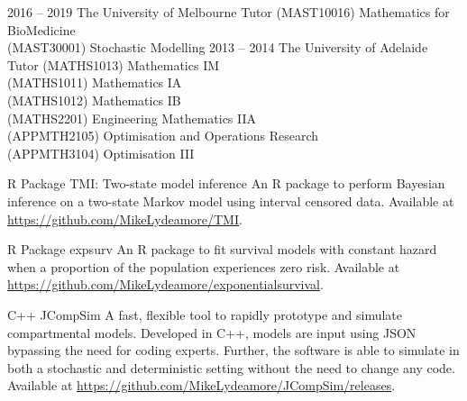 \documentclass[9pt]{developercv} %
\begin{document}
\begin{entrylist}
    \entry
        {2016 -- 2019}
        {The University of Melbourne}
        {Tutor}
        {(MAST10016) Mathematics for BioMedicine \\
        (MAST30001) Stochastic Modelling}
    \entry
        {2013 -- 2014}
        {The University of Adelaide}
        {Tutor}
        {(MATHS1013) Mathematics IM \\
        (MATHS1011) Mathematics IA \\
        (MATHS1012) Mathematics IB \\
        (MATHS2201) Engineering Mathematics IIA \\
        (APPMTH2105) Optimisation and Operations Research \\
        (APPMTH3104) Optimisation III}
\end{entrylist}


\begin{entrylist}
    \entry
        {R Package}
        {TMI: Two-state model inference}
        {}
        {An R package to perform Bayesian inference on a two-state Markov model using interval censored data. Available at \url{https://github.com/MikeLydeamore/TMI}.}
        
\entry
        {R Package}
        {expsurv}
        {}
        {An R package to fit survival models with constant hazard when a proportion of the population experiences zero risk. Available at \url{https://github.com/MikeLydeamore/exponentialsurvival}.}
        
\entry
        {C++}
        {JCompSim}
        {}
        {A fast, flexible tool to rapidly prototype and simulate compartmental models. Developed in C++, models are input using JSON bypassing the need for coding experts. Further, the software is able to simulate in both a stochastic and deterministic setting without the need to change any code. Available at \url{https://github.com/MikeLydeamore/JCompSim/releases}.}
\end{entrylist}
\end{document}
